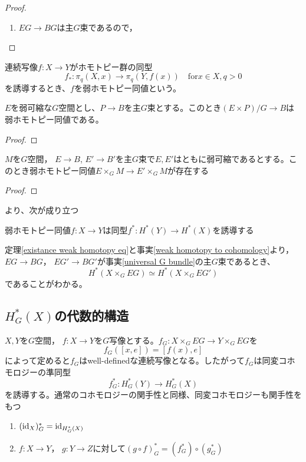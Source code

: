 \begin{proof}
  \begin{enumerate}
    \item $EG\rightarrow BG$は主$G$束であるので，
  \end{enumerate}
\end{proof}

連続写像$f\colon X\rightarrow Y$がホモトピー群の同型
\[
f_*\colon\pi_q(X, x)\rightarrow \pi_q(Y, f(x))\quad\text{for} x\in X, q>0 
\]
を誘導するとき、$f$を弱ホモトピー同値という。

\begin{lemm}
  $E$を弱可縮な$G$空間とし、$P\rightarrow B$を主$G$束とする。このとき$(E\times P)/G\rightarrow B$は弱ホモトピー同値である。
\end{lemm}

\begin{proof}
  
\end{proof}

\begin{theo}\label{existance weak homotopy eq}
  $M$を$G$空間， $E\rightarrow B$, $E'\rightarrow B'$を主$G$束で$E,E'$はともに弱可縮であるとする。このとき弱ホモトピー同値$E\times_GM\rightarrow E'\times_GM$が存在する
\end{theo}

\begin{proof}
  
\end{proof}

\cite{hatcher}より、次が成り立つ 
\begin{fact}\label{weak homotopy to cohomology}
  弱ホモトピー同値$f\colon X\rightarrow Y$は同型$f^*\colon H^*(Y)\rightarrow H^*(X)$を誘導する
\end{fact}

定理\ref{existance weak homotopy eq}と事実\ref{weak homotopy to cohomology}より， $EG\rightarrow BG$， $EG'\rightarrow BG'$が事実\ref{universal G bundle}の主$G$束であるとき、
\[
H^*(X\times_GEG)\simeq H^*(X\times_GEG')
\]
であることがわかる。

\subsection{$H^*_G(X)$の代数的構造}

$X, Y$を$G$空間， $f\colon X\rightarrow Y$を$G$写像とする。$f_G\colon X\times_GEG\rightarrow Y\times_GEG$を
\[
f_G([x, e])=[f(x), e]
\]
によって定めると$f_G$はwell-definedな連続写像となる。したがって$f_G$は同変コホモロジーの準同型
\[
f_G^*\colon H^*_G(Y)\rightarrow H^*_G(X)
\]
を誘導する。通常のコホモロジーの関手性と同様、同変コホモロジーも関手性をもつ
\begin{prop}\:
  \begin{enumerate}
    \item $(\text{id}_{X})_G^*=\text{id}_{H^*_G(X)}$
    \item $f\colon X\rightarrow Y$， $g\colon Y\rightarrow Z$に対して$(g\circ f)_G^*=(f_G^*)\circ(g_G^*)$
  \end{enumerate}
\end{prop}

